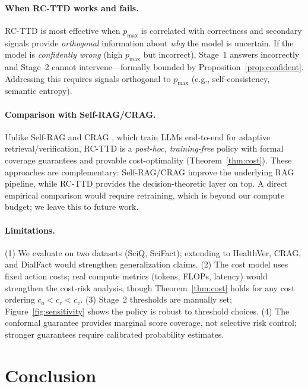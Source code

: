 \documentclass[letterpaper]{article}
\begin{document}
\paragraph{When RC-TTD works and fails.}
RC-TTD is most effective when $p_{\max}$ is correlated with correctness and secondary signals provide \emph{orthogonal} information about \emph{why} the model is uncertain. If the model is \emph{confidently wrong} (high $p_{\max}$ but incorrect), Stage~1 answers incorrectly and Stage~2 cannot intervene---formally bounded by Proposition~\ref{prop:confident}. Addressing this requires signals orthogonal to $p_{\max}$ (e.g., self-consistency, semantic entropy).

\paragraph{Comparison with Self-RAG/CRAG.}
Unlike Self-RAG \cite{asai2024selfrag} and CRAG \cite{yan2024crag}, which train LLMs end-to-end for adaptive retrieval/verification, RC-TTD is a \emph{post-hoc, training-free} policy with formal coverage guarantees and provable cost-optimality (Theorem~\ref{thm:cost}). These approaches are complementary: Self-RAG/CRAG improve the underlying RAG pipeline, while RC-TTD provides the decision-theoretic layer on top. A direct empirical comparison would require retraining, which is beyond our compute budget; we leave this to future work.

\paragraph{Limitations.}
(1) We evaluate on two datasets (SciQ, SciFact); extending to HealthVer, CRAG, and DialFact would strengthen generalization claims. (2) The cost model uses fixed action costs; real compute metrics (tokens, FLOPs, latency) would strengthen the cost-risk analysis, though Theorem~\ref{thm:cost} holds for any cost ordering $c_a < c_r < c_v$. (3) Stage~2 thresholds are manually set; Figure~\ref{fig:sensitivity} shows the policy is robust to threshold choices. (4) The conformal guarantee provides marginal score coverage, not selective risk control; stronger guarantees require calibrated probability estimates.

\section{Conclusion}
\end{document}
